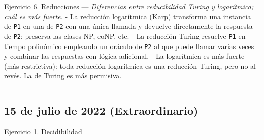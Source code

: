 \documentclass[12pt]{book} %
\begin{document}
Ejercicio 6. Reducciones --- \emph{Diferencias entre reducibilidad
Turing y logarítmica; cuál es más fuerte.} - La reducción logarítmica
(Karp) transforma una instancia de \texttt{P1} en una de \texttt{P2} con
una única llamada y devuelve directamente la respuesta de \texttt{P2};
preserva las clases NP, coNP, etc. - La reducción Turing resuelve
\texttt{P1} en tiempo polinómico empleando un oráculo de \texttt{P2} al
que puede llamar varias veces y combinar las respuestas con lógica
adicional. - La logarítmica es más fuerte (más restrictiva): toda
reducción logarítmica es una reducción Turing, pero no al revés. La de
Turing es más permisiva.

\begin{center}\rule{0.5\linewidth}{0.5pt}\end{center}

\hypertarget{de-julio-de-2022-extraordinario}{%
\subsection{15 de julio de 2022
(Extraordinario)}\label{de-julio-de-2022-extraordinario}}

Ejercicio 1. Decidibilidad
\end{document}
